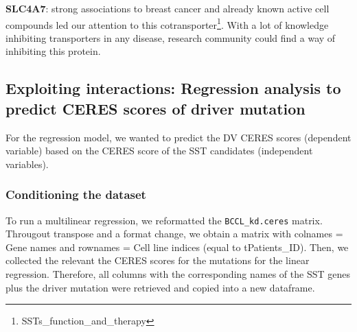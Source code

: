 \documentclass[]{article}
\let\rmarkdownfootnote\footnote%
\def\footnote{\protect\rmarkdownfootnote}
\begin{document}
\textbf{SLC4A7}: strong associations to breast cancer and already known
active cell compounds led our attention to this cotransporter\footnote{SSTs\_function\_and\_therapy}.
With a lot of knowledge inhibiting transporters in any disease, research
community could find a way of inhibiting this protein.

\hypertarget{exploiting-interactions-regression-analysis-to-predict-ceres-scores-of-driver-mutation}{%
\subsection{Exploiting interactions: Regression analysis to predict
CERES scores of driver
mutation}\label{exploiting-interactions-regression-analysis-to-predict-ceres-scores-of-driver-mutation}}

For the regression model, we wanted to predict the DV CERES scores
(dependent variable) based on the CERES score of the SST candidates
(independent variables).

\hypertarget{conditioning-the-dataset}{%
\subsubsection{Conditioning the
dataset}\label{conditioning-the-dataset}}

To run a multilinear regression, we reformatted the
\texttt{BCCL\_kd.ceres} matrix. Througout transpose and a format change,
we obtain a matrix with colnames = Gene names and rownames = Cell line
indices (equal to tPatients\_ID). Then, we collected the relevant the
CERES scores for the mutations for the linear regression. Therefore, all
columns with the corresponding names of the SST genes plus the driver
mutation were retrieved and copied into a new dataframe.
\end{document}
